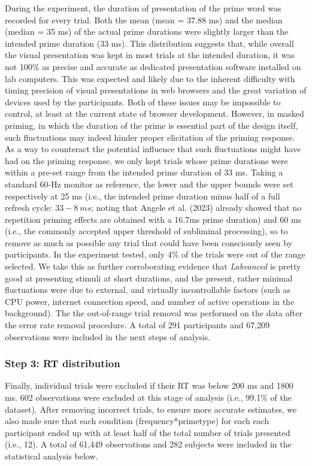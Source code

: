 \documentclass[
]{interact}
\begin{document}
During the experiment, the duration of presentation of the prime word
was recorded for every trial. Both the mean (mean = 37.88 ms) and the
median (median = 35 ms) of the actual prime durations were slightly
larger than the intended prime duration (33 ms). This distribution
suggests that, while overall the visual presentation was kept in most
trials at the intended duration, it was not 100\% as precise and
accurate as dedicated presentation software installed on lab computers.
This was expected and likely due to the inherent difficulty with timing
precision of visual presentations in web browsers and the great
variation of devices used by the participants. Both of these issues may
be impossible to control, at least at the current state of browser
development. However, in masked priming, in which the duration of the
prime is essential part of the design itself, such fluctuations may
indeed hinder proper elicitation of the priming response. As a way to
counteract the potential influence that such fluctuations might have had
on the priming response, we only kept trials whose prime durations were
within a pre-set range from the intended prime duration of 33 ms. Taking
a standard 60-Hz monitor as reference, the lower and the upper bounds
were set respectively at 25 ms (i.e., the intended prime duration minus
half of a full refresh cycle: \(33-8~ ms\); noting that Angele et al.
(2023) already showed that no repetition priming effects are obtained
with a 16.7ms prime duration) and 60 ms (i.e., the commonly accepted
upper threshold of subliminal processing), so to remove as much as
possible any trial that could have been consciously seen by
participants. In the experiment tested, only 4\% of the trials were out
of the range selected. We take this as further corroborating evidence
that \emph{Labvanced} is pretty good at presenting stimuli at short
durations, and the present, rather minimal fluctuations were due to
external, and virtually incontrollable factors (such as CPU power,
internet connection speed, and number of active operations in the
background). The the out-of-range trial removal was performed on the
data after the error rate removal procedure. A total of 291 participants
and 67,209 observations were included in the next steps of analysis.

\subsubsection{Step 3: RT distribution}\label{sec-exp1-analysis-RT}

Finally, individual trials were excluded if their RT was below 200 ms
and 1800 ms. 602 observations were excluded at this stage of analysis
(i.e., 99.1\% of the dataset). After removing incorrect trials, to
ensure more accurate estimates, we also made sure that each condition
(frequency*primetype) for each each participant ended up with at least
half of the total number of trials presented (i.e., 12). A total of
61,449 observations and 282 subjects were included in the statistical
analysis below.
\end{document}

